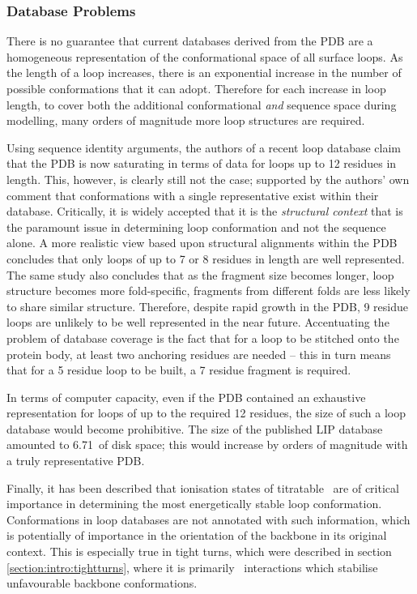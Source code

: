 \subsubsection{Database Problems}

There is no guarantee that current databases derived from the PDB are a homogeneous representation of the conformational space of all  surface loops. As the length of a loop increases, there is an exponential increase in the number of possible conformations that it can adopt.
Therefore for each increase in loop length,  to cover both the additional conformational \emph{and} sequence space during modelling,
many orders of magnitude more loop  structures are required. 

Using sequence identity arguments, the authors of a recent loop database
claim that the PDB is now saturating in terms of data for loops up to 12 residues in length\cite{METHOD:DB:Fuentes2006}. This, however, is clearly still
not the case; supported by the authors'  own comment that conformations with a single representative exist within their database. Critically, it is widely accepted that it is the \emph{structural context} that is the paramount issue in determining loop conformation and not the sequence alone. A more realistic view based upon structural alignments within the PDB concludes that only
loops of up to 7 or 8 residues in length are well represented\cite{NATIVE:RepresentationOfLoopsInPDB}. The same study also concludes that as the fragment size becomes longer, loop structure
becomes more fold-specific, \ie fragments from different folds
are less likely to share similar structure. Therefore, despite rapid growth
in the PDB, 9 residue loops are unlikely to be well represented in the near future.
Accentuating the problem of database coverage is the fact that for a loop to be stitched onto the protein body, at least
two anchoring residues are needed -- this in turn means that for a 5 residue loop to be built, a 7 residue fragment is required. 

In terms of computer capacity, even if the PDB contained an exhaustive representation for
loops of up to the required 12 residues, the size of such a loop database would
become prohibitive. The size of the published LIP database amounted to 6.71\gb\ of disk space; this would increase by orders of magnitude with a truly representative
 PDB.

Finally, it has been described that ionisation states of titratable \sidechains\
 are of critical importance in determining the most energetically stable loop conformation\cite{METHOD:Plop}. Conformations in loop databases are
not annotated with such information, which is potentially of importance in
the orientation of the backbone in its original context. This is especially
true in tight turns, which were described in section \ref{section:intro:tightturns}, where it is primarily \sidechain\ interactions which stabilise unfavourable backbone conformations.




